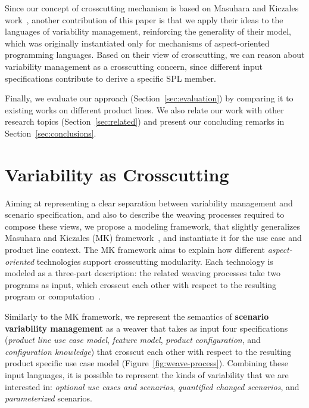 \documentclass[11pt]{report}
\begin{document}
Since our concept of crosscutting mechanism is based on Masuhara and Kiczales work~\cite{kiczales-ecoop-2003}, another 
contribution of this paper is that we apply their ideas to the languages of variability management,  reinforcing the generality of their model, which was originally instantiated only for mechanisms of aspect-oriented programming languages. Based on their view of crosscutting, we can reason about variability management as a crosscutting concern, since different input specifications contribute to derive a specific SPL member. 

Finally, we evaluate our approach (Section~\ref{sec:evaluation}) by comparing it 
to existing works on different product lines.  We 
also relate our work with other research topics (Section~\ref{sec:related}) and present 
our concluding remarks in Section~\ref{sec:conclusions}.

\section{Variability as Crosscutting}
\label{sec:models}

Aiming at representing a clear separation between variability management and
scenario specification, and also to describe the weaving processes required to
compose these views, we propose a modeling framework, that slightly generalizes
Masuhara and Kiczales (MK) framework~\cite{kiczales-ecoop-2003}, and instantiate
it for the use case and product line context. The MK framework aims to explain
how different \emph{aspect-oriented} technologies support crosscutting
modularity. Each technology is modeled as a three-part description: the related
weaving processes take two programs as input, which crosscut each other with
respect to the resulting program or computation~\cite{kiczales-ecoop-2003}.

Similarly to the MK framework, we represent the semantics of \textbf{scenario
variability management} as a weaver that takes as input four specifications
(\emph{product line use case model}, \emph{feature model}, \emph{product
configuration}, and \emph{configuration knowledge}) that crosscut each other with
respect to the resulting product specific use case model
(Figure~\ref{fig:weave-process}). Combining these input languages, it is possible
to represent the kinds of variability that we are interested in: \emph{optional
use cases and scenarios}, \emph{quantified changed scenarios}, and
\emph{parameterized} scenarios.
\end{document}
